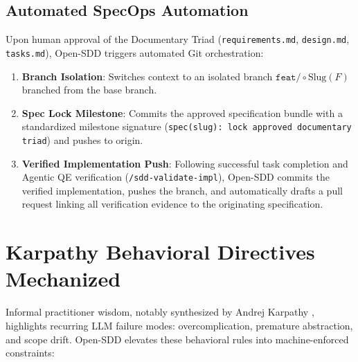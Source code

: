 \documentclass[11pt,a4paper]{article}
\begin{document}
\subsection{Automated SpecOps Automation}
Upon human approval of the Documentary Triad (\texttt{requirements.md}, \texttt{design.md}, \texttt{tasks.md}), Open-SDD triggers automated Git orchestration:
\begin{enumerate}
    \item \textbf{Branch Isolation}: Switches context to an isolated branch $\texttt{feat/} \circ \text{Slug}(F)$ branched from the base branch.
    \item \textbf{Spec Lock Milestone}: Commits the approved specification bundle with a standardized milestone signature (\texttt{spec(slug): lock approved documentary triad}) and pushes to origin.
    \item \textbf{Verified Implementation Push}: Following successful task completion and Agentic QE verification (\texttt{/sdd-validate-impl}), Open-SDD commits the verified implementation, pushes the branch, and automatically drafts a pull request linking all verification evidence to the originating specification.
\end{enumerate}

\section{Karpathy Behavioral Directives Mechanized}

Informal practitioner wisdom, notably synthesized by Andrej Karpathy \cite{karpathy2025}, highlights recurring LLM failure modes: overcomplication, premature abstraction, and scope drift. Open-SDD elevates these behavioral rules into machine-enforced constraints:

\begin{table}[h!]
\centering
\small
\caption{Mechanization of Karpathy Guidelines in Open-SDD.}
\label{tab:karpathy}
\end{table}
\end{document}
